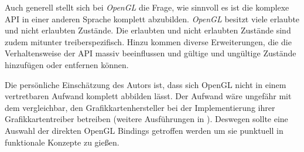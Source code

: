Auch generell stellt sich bei \textit{OpenGL} die Frage, wie sinnvoll es ist die komplexe \acs{API} in einer anderen Sprache komplett abzubilden. \textit{OpenGL} besitzt viele erlaubte und nicht erlaubten Zustände. Die erlaubten und nicht erlaubten Zustände sind zudem mitunter treiberspezifisch. Hinzu kommen diverse Erweiterungen, die die Verhaltensweise der \acs{API} massiv beeinflussen und gültige und ungültige Zustände hinzufügen oder entfernen können.

Die persönliche Einschätzung des Autors ist, dass sich OpenGL nicht in einem vertretbaren Aufwand komplett abbilden lässt. Der Aufwand wäre ungefähr mit dem vergleichbar, den Grafikkartenhersteller bei der Implementierung ihrer Grafikkartentreiber betreiben (weitere Ausführungen in ). Deswegen sollte eine Auswahl der direkten OpenGL Bindings getroffen werden um sie punktuell in funktionale Konzepte zu gießen.


